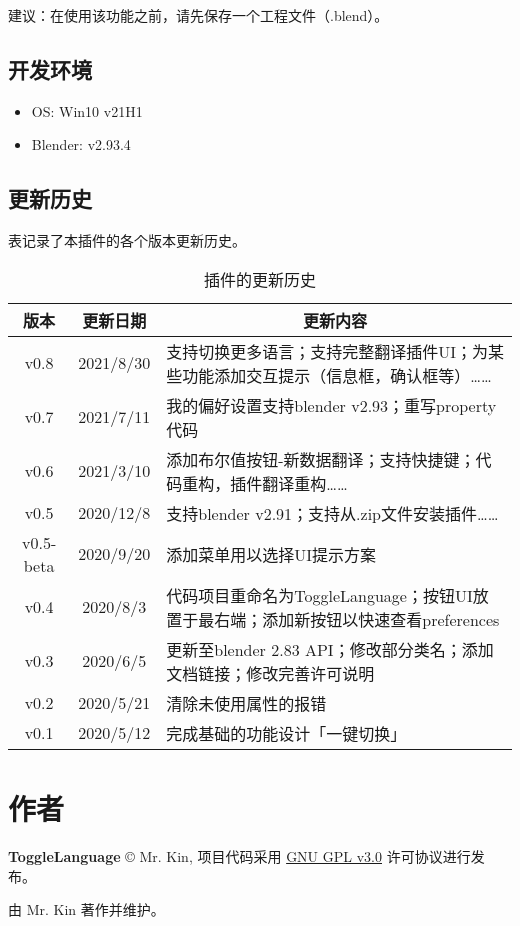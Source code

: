 \documentclass{../../PublicResources/DocClass}
\begin{document}
建议：在使用该功能之前，请先保存一个工程文件（.blend）。

\subsection{开发环境}
\begin{itemize}
    \item OS: Win10 v21H1
    \item Blender: v2.93.4
\end{itemize}

\newpage
\subsection{更新历史}
表记录了本插件的各个版本更新历史。
\begin{table}[h!]
    \caption{插件的更新历史}
    \label{更新历史}
    \begin{tabular}{|*{2}{c|}m{305pt}|}
        \hline
        版本 & 更新日期 & \multicolumn{1}{c|}{更新内容} \\
        \hline
        v0.8 & 2021/8/30 & 支持切换更多语言；支持完整翻译插件UI；为某些功能添加交互提示（信息框，确认框等）…… \\
        \hline
        v0.7 & 2021/7/11 & 我的偏好设置支持blender v2.93；重写property代码 \\
        \hline
        v0.6 & 2021/3/10 & 添加布尔值按钮-新数据翻译；支持快捷键；代码重构，插件翻译重构…… \\
        \hline
        v0.5 & 2020/12/8 & 支持blender v2.91；支持从.zip文件安装插件…… \\
        \hline
        v0.5-beta & 2020/9/20 & 添加菜单用以选择UI提示方案 \\
        \hline
        v0.4 & 2020/8/3 & 代码项目重命名为ToggleLanguage；按钮UI放置于最右端；添加新按钮以快速查看preferences \\
        \hline
        v0.3 & 2020/6/5 & 更新至blender 2.83 API；修改部分类名；添加文档链接；修改完善许可说明 \\
        \hline
        v0.2 & 2020/5/21 & 清除未使用属性的报错 \\
        \hline
        v0.1 & 2020/5/12 & 完成基础的功能设计「一键切换」 \\
        \hline
    \end{tabular}
\end{table}


\section{作者}
\textbf{ToggleLanguage} © Mr. Kin, 项目代码采用 \href{https://github.com/Mister-Kin/ToggleLanguage/blob/master/LICENSE}{GNU GPL v3.0} 许可协议进行发布。

由 Mr. Kin 著作并维护。

\appendix
\end{document}
